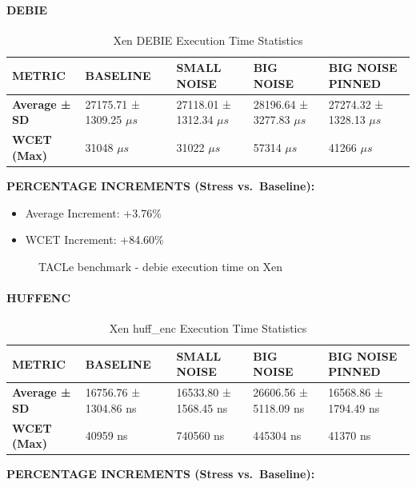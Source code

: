 \paragraph{DEBIE}\label{debie-1}

\begin{table}
\centering
\caption{Xen DEBIE Execution Time Statistics}
\begin{tabularx}{\linewidth}{@{}YYYYY@{}}
\toprule
METRIC & BASELINE & SMALL NOISE & BIG NOISE & BIG NOISE PINNED\tabularnewline
\midrule
\textbf{Average ± SD} & 27175.71 ± 1309.25 $\mu s$ & 27118.01 ± 1312.34 $\mu s$ & 28196.64 ± 3277.83 $\mu s$ & 27274.32 ± 1328.13 $\mu s$\tabularnewline
\textbf{WCET (Max)} & 31048 $\mu s$ & 31022 $\mu s$ & 57314 $\mu s$ & 41266 $\mu s$\tabularnewline
\bottomrule
\end{tabularx}
\end{table}

\textbf{PERCENTAGE INCREMENTS (Stress vs.~Baseline):}

\begin{itemize}
\item
  Average Increment: +3.76\%
\item
  WCET Increment: +84.60\%
\end{itemize}

\begin{figure}
\centering

\caption{TACLe benchmark - debie execution time on Xen}
\end{figure}

\paragraph{HUFFENC}\label{huffenc-1}

\begin{table}
\centering
\caption{Xen huff\_enc Execution Time Statistics}
\begin{tabularx}{\linewidth}{@{}YYYYY@{}}
\toprule
METRIC & BASELINE & SMALL NOISE & BIG NOISE & BIG NOISE PINNED\tabularnewline
\midrule
\textbf{Average ± SD} & 16756.76 ± 1304.86 ns & 16533.80 ± 1568.45 ns & 26606.56 ± 5118.09 ns & 16568.86 ± 1794.49 ns\tabularnewline
\textbf{WCET (Max)} & 40959 ns & 740560 ns & 445304 ns & 41370 ns\tabularnewline
\bottomrule
\end{tabularx}
\end{table}

\textbf{PERCENTAGE INCREMENTS (Stress vs.~Baseline):}

